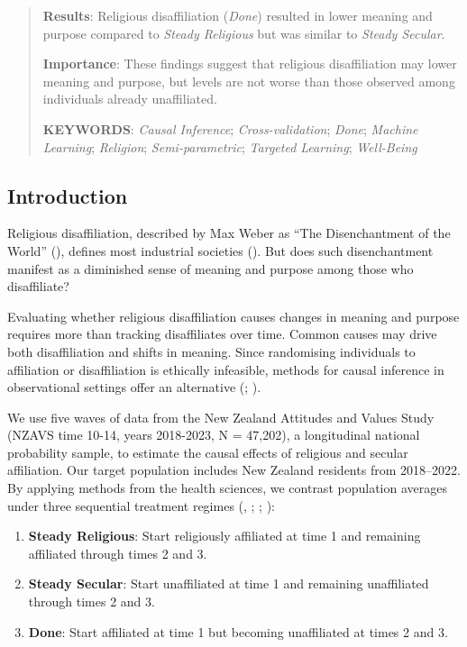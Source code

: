 \documentclass[
  single column]{article}
\providecommand{\tightlist}{%
  \setlength{\itemsep}{0pt}\setlength{\parskip}{0pt}}\usepackage{longtable,booktabs,array}
\begin{document}
\begin{abstract}
\textbf{Results}: Religious disaffiliation (\emph{Done}) resulted in
lower meaning and purpose compared to \emph{Steady Religious} but was
similar to \emph{Steady Secular}.

\textbf{Importance}: These findings suggest that religious
disaffiliation may lower meaning and purpose, but levels are not worse
than those observed among individuals already unaffiliated.

\textbf{KEYWORDS}: \emph{Causal Inference}; \emph{Cross-validation};
\emph{Done}; \emph{Machine Learning}; \emph{Religion};
\emph{Semi-parametric}; \emph{Targeted Learning}; \emph{Well-Being}
\end{abstract}


\subsection{Introduction}\label{introduction}

Religious disaffiliation, described by Max Weber as ``The Disenchantment
of the World'' (), defines most industrial societies
(). But does such
disenchantment manifest as a diminished sense of meaning and purpose
among those who disaffiliate?

Evaluating whether religious disaffiliation causes changes in meaning
and purpose requires more than tracking disaffiliates over time. Common
causes may drive both disaffiliation and shifts in meaning. Since
randomising individuals to affiliation or disaffiliation is ethically
infeasible, methods for causal inference in observational settings offer
an alternative (;
).

We use five waves of data from the New Zealand Attitudes and Values
Study (NZAVS time 10-14, years 2018-2023, N = 47,202), a longitudinal
national probability sample, to estimate the causal effects of religious
and secular affiliation. Our target population includes New Zealand
residents from 2018--2022. By applying methods from the health sciences,
we contrast population averages under three sequential treatment regimes
(,
;
;
):

\begin{enumerate}
\def\labelenumi{\arabic{enumi}.}
\tightlist
\item
  \textbf{Steady Religious}: Start religiously affiliated at time 1 and
  remaining affiliated through times 2 and 3.\\
\item
  \textbf{Steady Secular}: Start unaffiliated at time 1 and remaining
  unaffiliated through times 2 and 3.\\
\item
  \textbf{Done}: Start affiliated at time 1 but becoming unaffiliated at
  times 2 and 3.
\end{enumerate}
\end{document}
